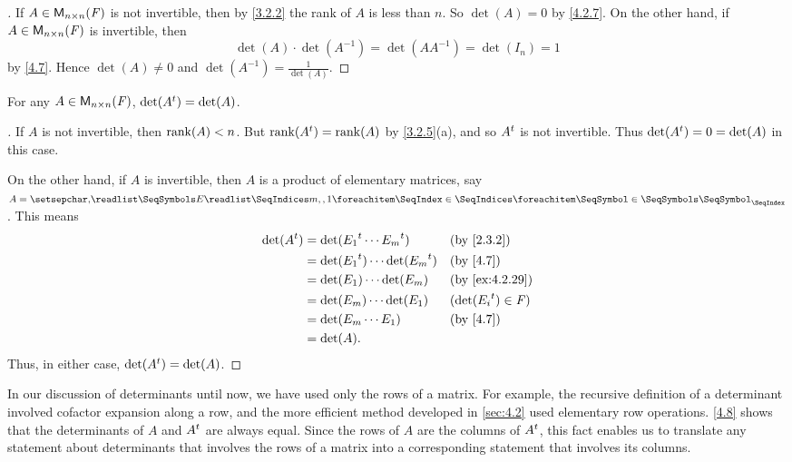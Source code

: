 \begin{proof}[]
  If \(A \in \mathsf{M}_{{n} \times n}({\mathit{F}})\) is not invertible, then by \cref{3.2.2} the rank of \(A\) is less than \(n\).
  So \(\det(A) = 0\) by \cref{4.2.7}.
  On the other hand, if \(A \in \mathsf{M}_{{n} \times n}({\mathit{F}})\) is invertible, then
  \[
    \det(A) \cdot \det(A^{-1}) = \det(A A^{-1}) = \det(I_n) = 1
  \]
  by \cref{4.7}.
  Hence \(\det(A) \neq 0\) and \(\det(A^{-1}) = \frac{1}{\det(A)}\).
\end{proof}

\begin{thm}\label{4.8}
  For any \(A \in \mathsf{M}_{{n} \times n}({\mathit{F}})\), \(\det({A}^{t}) = \det(A)\).
\end{thm}

\begin{proof}[]
  If \(A\) is not invertible, then \(\rk{A} < n\).
  But \(\rk{\tp{A}} = \rk{A}\) by \cref{3.2.5}(a), and so \({A}^{t}\) is not invertible.
  Thus \(\det({A}^{t}) = 0 = \det(A)\) in this case.

  On the other hand, if \(A\) is invertible, then \(A\) is a product of elementary matrices, say \(A = \seq[]{E}{m,,1}\).
  This means
  \begin{align*}
    \det(\tp{A}) & = \det(\tp{E_1} \cdots \tp{E_m})       &  & \text{(by \cref{2.3.2})}     \\
                 & = \det(\tp{E_1}) \cdots \det(\tp{E_m}) &  & \text{(by \cref{4.7})}       \\
                 & = \det(E_1) \cdots \det(E_m)           &  & \text{(by \cref{ex:4.2.29})} \\
                 & = \det(E_m) \cdots \det(E_1)           &  & (\det(\tp{E_i}) \in \F)      \\
                 & = \det(E_m \cdots E_1)                 &  & \text{(by \cref{4.7})}       \\
                 & = \det(A).
  \end{align*}
  Thus, in either case, \(\det({A}^{t}) = \det(A)\).
\end{proof}

\begin{note}
  In our discussion of determinants until now, we have used only the rows of a matrix.
  For example, the recursive definition of a determinant involved cofactor expansion along a row, and the more efficient method developed in \cref{sec:4.2} used elementary row operations.
  \cref{4.8} shows that the determinants of \(A\) and \({A}^{t}\) are always equal.
  Since the rows of \(A\) are the columns of \({A}^{t}\), this fact enables us to translate any statement about determinants that involves the rows of a matrix into a corresponding statement that involves its columns.
\end{note}

